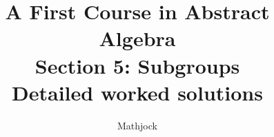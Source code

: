 
\title{\textbf{A First Course in Abstract Algebra}\\[0.3em]Section 5: Subgroups\\[0.3em]\large Detailed worked solutions}
\author{Mathjock}
\date{}

\maketitle
\bookinfo
\tableofcontents
\clearpage
\renewcommand{\thesection}{5}
\renewcommand{\theHsection}{fraleigh.5}


